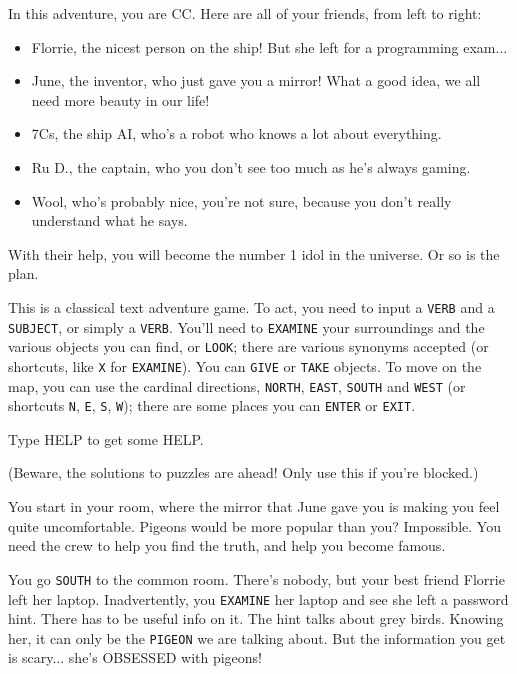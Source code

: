 \documentclass{article}
\newcommand{\bckg}[1]{\AddToShipoutPictureBG*{\texttt{[image: \#1]}}}
\begin{document}
In this adventure, you are CC.
Here are all of your friends, from left to right:
\begin{itemize}
    \item Florrie, the nicest person on the ship! But she left for a programming exam...
    \item June, the inventor, who just gave you a mirror! What a good idea, we all need more beauty in our life!
    \item 7Cs, the ship AI, who's a robot who knows a lot about everything.
    \item Ru D., the captain, who you don't see too much as he's always gaming.
    \item Wool, who's probably nice, you're not sure, because you don't really understand what he says.
\end{itemize}

With their help, you will become the number 1 idol in the universe. Or so is the plan.

\clearpage
{}
\bckg{img/bg}

This is a classical text adventure game.
To act, you need to input a \texttt{VERB} and a \texttt{SUBJECT}, or simply a \texttt{VERB}.
You'll need to \texttt{EXAMINE} your surroundings and the various objects you can find,
or \texttt{LOOK}; there are various synonyms accepted (or shortcuts, like \texttt{X} for \texttt{EXAMINE}).
You can \texttt{GIVE} or \texttt{TAKE} objects.
To move on the map, you can use the cardinal directions, \texttt{NORTH}, \texttt{EAST},
\texttt{SOUTH} and \texttt{WEST} (or shortcuts \texttt{N}, \texttt{E}, \texttt{S}, \texttt{W});
there are some places you can \texttt{ENTER} or \texttt{EXIT}.

Type HELP to get some HELP.

\clearpage

\clearpage
{}
\bckg{img/bg}

(Beware, the solutions to puzzles are ahead! Only use this if you're blocked.)

You start in your room, where the mirror that June gave you is making you feel quite uncomfortable.
Pigeons would be more popular than you? Impossible.
You need the crew to help you find the truth, and help you become famous.

You go \texttt{SOUTH} to the common room.
There's nobody, but your best friend Florrie left her laptop.
Inadvertently, you \texttt{EXAMINE} her laptop and see she left a password hint.
There has to be useful info on it. The hint talks about grey birds.
Knowing her, it can only be the \texttt{PIGEON} we are talking about.
But the information you get is scary... she's OBSESSED with pigeons!
\end{document}
